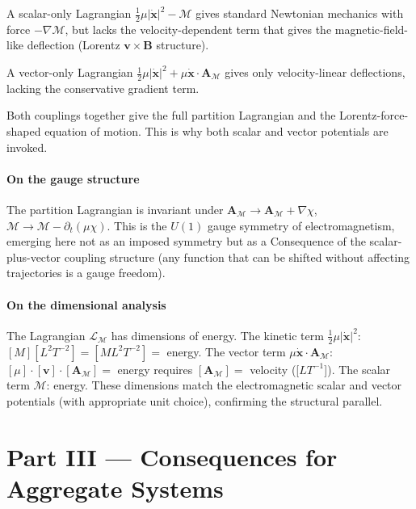 \documentclass[11pt,twocolumn,a4paper]{article}
\theoremstyle{axiomstyle}
\theoremstyle{conseqstyle}
\theoremstyle{definition}
\theoremstyle{remark}
\newcommand{\Depth}{\mathcal{M}}
\newcommand{\Apartition}{\bm{A}_{\Depth}}
\newcommand{\Lagr}{\mathcal{L}}
\begin{document}
A scalar-only Lagrangian $\tfrac{1}{2}\mu|\dot{\mathbf{x}}|^{2}-\Depth$ gives standard Newtonian mechanics with force $-\nabla\Depth$, but lacks the velocity-dependent term that gives the magnetic-field-like deflection (Lorentz $\mathbf{v}\times\mathbf{B}$ structure).

A vector-only Lagrangian $\tfrac{1}{2}\mu|\dot{\mathbf{x}}|^{2}+\mu\dot{\mathbf{x}}\cdot\Apartition$ gives only velocity-linear deflections, lacking the conservative gradient term.

Both couplings together give the full partition Lagrangian and the Lorentz-force-shaped equation of motion. This is why both scalar and vector potentials are invoked.

\subsection{On the gauge structure}

The partition Lagrangian is invariant under $\Apartition\to\Apartition+\nabla\chi$, $\Depth\to\Depth-\partial_{t}(\mu\chi)$. This is the $U(1)$ gauge symmetry of electromagnetism, emerging here not as an imposed symmetry but as a Consequence of the scalar-plus-vector coupling structure (any function that can be shifted without affecting trajectories is a gauge freedom).

\subsection{On the dimensional analysis}

The Lagrangian $\Lagr_{\Depth}$ has dimensions of energy. The kinetic term $\tfrac{1}{2}\mu|\dot{\mathbf{x}}|^{2}$: $[M][L^{2}T^{-2}]=[M L^{2} T^{-2}]=$ energy. The vector term $\mu\dot{\mathbf{x}}\cdot\Apartition$: $[\mu]\cdot[\mathbf{v}]\cdot[\Apartition]=$ energy requires $[\Apartition]=$ velocity ([$LT^{-1}$]). The scalar term $\Depth$: energy. These dimensions match the electromagnetic scalar and vector potentials (with appropriate unit choice), confirming the structural parallel.

\clearpage

\part*{Part III --- Consequences for Aggregate Systems}
\end{document}
